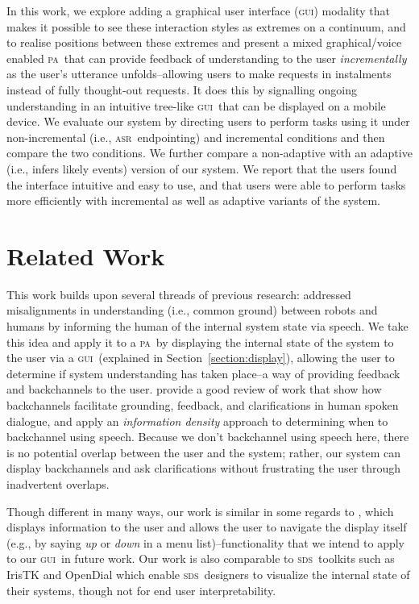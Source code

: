 \documentclass[11pt]{article}
\newcommand{\sds}[0]{\textsc{sds}}
\newcommand{\asr}[0]{\textsc{asr}}
\newcommand{\ui}[0]{\textsc{gui}}
\newcommand{\pa}[0]{\textsc{pa}}
\begin{document}
In this work, we explore adding a graphical user interface (\ui) modality that makes it possible to see these interaction styles as extremes on a continuum, and to realise positions between these extremes and present a mixed graphical/voice enabled \pa\ that can provide feedback of understanding to the user \emph{incrementally} as the user's utterance unfolds--allowing users to make requests in instalments instead of fully thought-out requests. It does this by signalling ongoing understanding in an intuitive tree-like \ui\ that can be displayed on a mobile device. We evaluate our system by directing users to perform tasks using it under non-incremental (i.e., \asr\ endpointing) and incremental conditions and then compare the two conditions. We further compare a non-adaptive with an adaptive (i.e., infers likely events) version of our system. We report that the users found the interface intuitive and easy to use, and that users were able to perform tasks more efficiently with incremental as well as adaptive variants of the system.

\section{Related Work}
\label{section:related_work}

This work builds upon several threads of previous research:  addressed misalignments in understanding (i.e., common ground) \cite{clarkschaefer:contrdis} between robots and humans by informing the human of the internal system state via speech. We take this idea and apply it to a \pa\ by displaying the internal state of the system to the user via a \ui\ (explained in Section~\ref{section:display}), allowing the user to determine if system understanding has taken place--a way of providing feedback and backchannels to the user.  provide a good review of work that show how backchannels facilitate grounding, feedback, and clarifications in human spoken dialogue, and apply an \emph{information density} approach to determining when to backchannel using speech. Because we don't backchannel using speech here, there is no potential overlap between the user and the system; rather, our system can display backchannels and ask clarifications without frustrating the user through inadvertent overlaps.

Though different in many ways, our work is similar in some regards to , which displays information to the user and allows the user to navigate the display itself (e.g., by saying \emph{up} or \emph{down} in a menu list)--functionality that we intend to apply to our \ui\ in future work. Our work is also comparable to \sds\ toolkits such as IrisTK \cite{Skantze2012a} and OpenDial \cite{Lison2015a} which enable \sds\ designers to visualize the internal state of their systems, though not for end user interpretability. 
\end{document}

